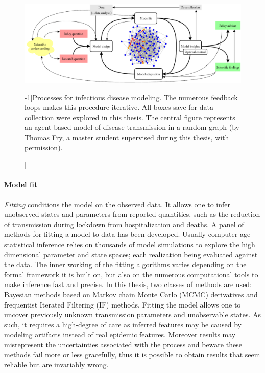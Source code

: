  \begin{figure}\centering
  \includegraphics{fig/modeling_cycle}
  \caption[Processes for infectious disease modeling][-1\baselineskip]{Processes for  infectious disease modeling. The numerous feedback loops makes this procedure iterative. All boxes save for data collection were explored in this thesis. The central figure represents an agent-based model of disease transmission in a random graph (by Thomas Fry, a master student supervised during this thesis, with permission).}\label{fig:modeling}
\end{figure}
\paragraph{Model fit} \textit{Fitting} conditions the model on the observed data. It allows one to infer unobserved states and parameters from reported quantities, such as the reduction of transmission during lockdown from hospitalization and deaths. A panel of methods for fitting a model to data has been developed. Usually computer-age statistical inference relies on thousands of model simulations to explore the high dimensional parameter and state spaces; each realization being evaluated against the data. The inner working of the fitting algorithms varies depending on the formal framework it is built on, but also on the numerous computational tools to make inference fast and precise. In this thesis, two classes of methods are used: Bayesian methods based on Markov chain Monte Carlo (MCMC) derivatives and frequentist Iterated Filtering (IF) methods. Fitting the model allows one to uncover previously unknown transmission parameters and unobservable states. As such, it requires a high-degree of care as inferred features may be caused by modeling artifacts instead of real epidemic features. Moreover results may misrepresent the uncertainties associated with the process and beware these methods fail more or less gracefully, thus it is possible to obtain results that seem reliable but are invariably wrong.
 
